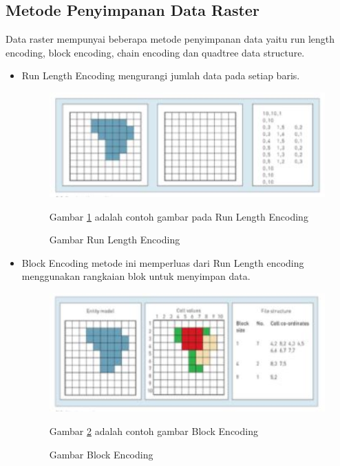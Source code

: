 \subsection{Metode Penyimpanan Data Raster}
Data raster mempunyai beberapa metode penyimpanan data yaitu run length encoding, block encoding, chain encoding dan quadtree data structure.
	\begin{itemize}
		\item  Run Length Encoding
				mengurangi jumlah data pada setiap baris.
				\begin{figure} [ht]
					\centerline{\includegraphics[width=1\textwidth]{figures/runlengthencoding.JPG}}
					\caption{Gambar Run Length Encoding}
					\label{runlengthencoding}
					Gambar \ref{runlengthencoding} adalah contoh gambar pada Run Length Encoding
				\end{figure}

		\item  Block Encoding
				metode ini memperluas dari Run Length encoding menggunakan rangkaian blok untuk menyimpan data.
				\begin{figure} [ht]
					\centerline{\includegraphics[width=1\textwidth]{figures/blockencoding.JPG}}
					\caption{Gambar Block Encoding}
					\label{blockencoding}
					Gambar \ref{blockencoding} adalah contoh gambar Block Encoding
				\end{figure}


\end{itemize}
